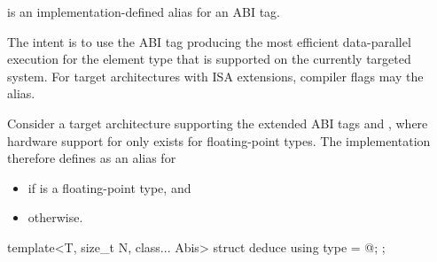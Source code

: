 \pnum
{} is an implementation-defined alias for an ABI tag. \begin{note}The intent is to use the ABI tag producing the most efficient data-parallel execution for the element type  that is supported on the currently targeted system.  For target architectures with ISA extensions, compiler flags may  the  alias.\end{note}
\begin{example}
  Consider a target architecture supporting the extended ABI tags  and , where hardware support for  only exists for floating-point types. The implementation therefore defines  as an alias for
  \begin{itemize}
    \item {} if  is a floating-point type, and
    \item {} otherwise.
  \end{itemize}
\end{example}

\begin{itemdecl}
template<T, size_t N, class... Abis> struct deduce { using type = @\seebelow@; };
\end{itemdecl}

